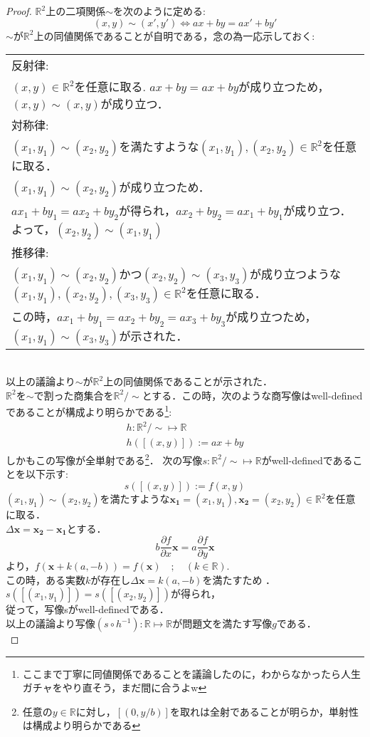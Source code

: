 \documentclass{jarticle}
\begin{document}
\begin{proof}
$\mathbb{R}^2 $上の二項関係$\sim$を次のように定める:\\
$$
(x,y) \sim (x',y') \Longleftrightarrow ax+by=ax'+by'
$$
$\sim$が$\mathbb{R}^2$上の同値関係であることが自明である，念の為一応示しておく:\\
\begin{tabular}{|p{10cm}|}
\hline
反射律:\\
$(x,y) \in \mathbb{R}^2$を任意に取る. $ax+by=ax+by$が成り立つため，$(x,y) \sim (x,y)$が成り立つ．\\
\hline
対称律:\\
$(x_1,y_1) \sim (x_2,y_2)$を満たすような$(x_1,y_1),(x_2,y_2) \in \mathbb{R}^2$を任意に取る．\\
$(x_1,y_1) \sim (x_2,y_2)$が成り立つため．\\
$ax_1+by_1=ax_2+by_2$が得られ，$ax_2+by_2=ax_1+by_1$が成り立つ．よって，$(x_2,y_2) \sim (x_1,y_1)$\\
\hline
推移律:\\
$(x_1,y_1) \sim (x_2,y_2)$かつ$(x_2,y_2) \sim (x_3,y_3)$が成り立つような$(x_1,y_1),(x_2,y_2),(x_3,y_3) \in \mathbb{R}^2$を任意に取る．\\
この時，$ax_1+by_1=ax_2+by_2=ax_3+by_3$が成り立つため，$(x_1,y_1) \sim (x_3,y_3)$が示された．\\
\hline
\end{tabular}
\\
\noindent 以上の議論より$\sim$が$\mathbb{R}^2$上の同値関係であることが示された．\\
$\mathbb{R}^2$を$\sim$で割った商集合を$\mathbb{R}^2 / \sim$とする．この時，次のような商写像はwell-definedであることが構成より明らかである\footnote{ここまで丁寧に同値関係であることを議論したのに，わからなかったら人生ガチャをやり直そう，まだ間に合うよw}:
\begin{align}
 h: \mathbb{R}^2 / \sim \mapsto \mathbb{R}\\
 h([(x,y)]) := ax+by
\end{align}
しかもこの写像が全単射である\footnote{任意の$y \in \mathbb{R}$に対し，$[(0,y/b)]$を取れは全射であることが明らか，単射性は構成より明らかである}．
次の写像$s : \mathbb{R}^2 / \sim \mapsto \mathbb{R}$がwell-definedであることを以下示す:\\
$$
s([(x,y)]) := f(x,y)
$$
$(x_1,y_1) \sim (x_2,y_2)$を満たすような$\bm{x_{1}}=(x_1,y_1),\bm{x_{2}}=(x_2,y_2) \in \mathbb{R}^2$を任意に取る．\\
$\Delta \bm{x}= \bm{x_2}-\bm{x_1}$とする．\\ 
$$
b \frac{\partial f}{\partial x} \bm{x} = a \frac{\partial f}{\partial y} \bm{x}
$$
より，$f(\bm{x}+k(a,-b))=f(\bm{x}) \quad ;\quad \left(k \in \mathbb{R} \right)$.\\
この時，ある実数$k$が存在し$\Delta \bm{x} = k(a,-b)$を満たすため ．$s([(x_1,y_1)]) = s([(x_2,y_2)])$が得られ，\\
従って，写像sがwell-definedである．\\
以上の議論より写像$(s \circ h^{-1}) : \mathbb{R} \mapsto \mathbb{R}$が問題文を満たす写像$g$である．\\
\end{proof}
\end{document}
